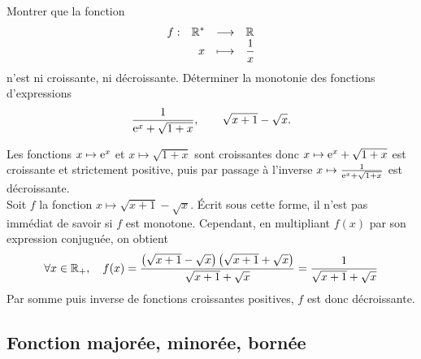 \documentclass{magnoliaold}
\begin{document}
\begin{exos}
  \exo Montrer que la fonction
  \[\begin{array}[t]{lrcl} \displaystyle{f} : & \displaystyle{{\mathbb{R}^*}} & \longrightarrow & \displaystyle{\mathbb{R}} \\ & \displaystyle{x} & \longmapsto & \displaystyle{\frac{1}{x}} \end{array}\]
  n'est ni croissante, ni décroissante.
\exo Déterminer la monotonie des fonctions d'expressions
  \[\frac{1}{{\rm e}^x+\sqrt{1+x}}, \qquad \sqrt{x+1}-\sqrt{x}.\]
  \begin{sol}
Les fonctions $x\mapsto {\rm e}^{x}$ et $x \mapsto \sqrt{1+x}$ sont croissantes donc $ x\mapsto {\rm e}^x+\sqrt{1+x}$ est croissante et strictement positive, puis  par passage à l'inverse $ x \mapsto \frac{1}{{\rm e}^x+\sqrt{1+x}}$ est décroissante.\\
Soit $f$ la fonction $ x \mapsto \sqrt{x+1}-\sqrt{x}$. Écrit sous cette forme, il n'est pas immédiat de savoir si $f$ est monotone. Cependant, en multipliant $f(x)$ par son expression conjuguée, on obtient
  $$\forall x\in\mathbb{R}_+ ,\quad f(x)=\frac{
    \left(\sqrt{x+1}-\sqrt{x}\right)\left(\sqrt{x+1}+\sqrt{x}\right)}{\sqrt{x+1}+\sqrt{x}}
    =\frac{1}{\sqrt{x+1}+\sqrt{x}}$$
Par somme puis inverse de fonctions croissantes positives, $f$ est donc décroissante.
  \end{sol}
\end{exos}

\subsection{Fonction majorée, minorée, bornée}

\end{document}
